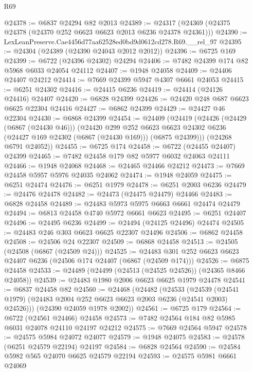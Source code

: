 \begin{lexlean}{R69}
\begin{coremodule}
{@24378 := @6837 @24294 @82 @2013
@24389 := @24317 (@24369 (@24375 @24378 (@24370 @252 @6623 @6623 @2013 @6236 @24378 @24361)))
@24390 := LexLeanPreserve.Cae4456d77aa62528ed0bd9d0612cd278.R69.__rel_97
@24395 := @24304 (@24389 (@24390 @24043 @2012 @2012))
@24396 := @6725 @169
@24399 := @6722 (@24396 @24302) @24294
@24406 := @7482 @24399 @174 @82 @5968 @6033 @24054 @24112
@24407 := @1948 @24058
@24409 := @24406 @24407 @24212
@24414 := @7669 @24399 @5947 @4307 @6661 @24053
@24415 := @6251 @24302
@24416 := @24415 @6236
@24419 := @24414 (@24126 @24416) @24407
@24420 := @6828 @24399
@24426 := @24420 @248 @687 @6623 @6625 @22304 @24416
@24427 := @6862 @24399
@24429 := @24427 @46 @22304
@24430 := @6868 @24399
@24454 := @24409
    (@24419
      (@24426
        (@24429 (@6867 (@24430 @46)))
        (@24420
          @299
          @252
          @6623
          @6623
          @24302
          @6236
          (@24427 @169 @24302 (@6867 (@24430 @169)))
          (@6875 @24399)))
      (@24268 @6791 @24052))
@24455 := @6725 @174
@24458 := @6722 (@24455 @24407) @24399
@24465 := @7482 @24458 @179 @82 @5977 @6032 @24063 @24111
@24466 := @1948 @24068
@24468 := @24465 @24466 @24212
@24473 := @7669 @24458 @5957 @5976 @24035 @24062
@24474 := @1948 @24059
@24475 := @6251 @24474
@24476 := @6251 @1979
@24478 := @6251 @2003 @6236
@24479 := @24476 @24478
@24482 := @24473 (@24475 @24479) @24466
@24483 := @6828 @24458
@24489 := @24483 @5973 @5975 @6663 @6661 @24474 @24479
@24494 := @6813 @24458 @4740 @5972 @6661 @6623
@24495 := @6251 @24407
@24496 := @24495 @6236
@24499 := @24494 (@24125 @24496) @24474
@24505 := @24483 @246 @303 @6623 @6625 @22307 @24496
@24506 := @6862 @24458
@24508 := @24506 @24 @22307
@24509 := @6868 @24458
@24513 := @24505 (@24508 (@6867 (@24509 @24)))
@24525 := @24483 @301 @252 @6623 @6623 @24407 @6236 (@24506 @174 @24407 (@6867 (@24509 @174)))
@24526 := @6875 @24458
@24533 := @24489 (@24499 (@24513 (@24525 @24526)) (@24365 @8466 @24058))
@24539 := @24483 @1980 @2006 @6623 @6625 @1979 @24478
@24541 := @6837 @24458 @82
@24560 := @24468
    (@24482
      (@24533
        (@24539 (@24541 @1979) (@24483 @2004 @252 @6623 @6623 @2003 @6236 (@24541 @2003) @24526)))
      (@24390 @24059 @1978 @2002))
@24561 := @6725 @179
@24564 := @6722 (@24561 @24466) @24458
@24573 := @7482 @24564 @184 @82 @5985 @6031 @24078 @24110 @24197 @24212
@24575 := @7669 @24564 @5947
@24578 := @24575 @5984 @24072 @24077
@24579 := @1948 @24075
@24583 := @24578 (@6251 @24579 @22194) @24197
@24584 := @6828 @24564
@24590 := @24584 @5982 @565 @24070 @6625 @24579 @22194
@24593 := @24575 @5981 @6661 @24069
}
\end{coremodule}
\end{lexlean}
